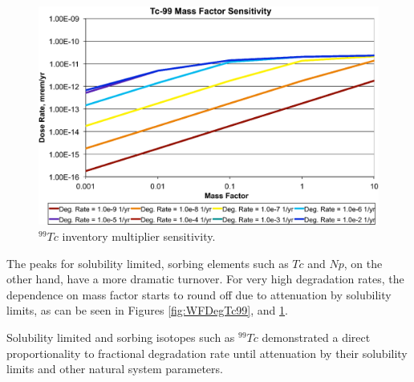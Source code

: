 \begin{figure}[H]
  \centering
  \includegraphics[width=\linewidth]{Tc99_mass_factor.eps}
  \caption{$^{99}Tc$ inventory multiplier sensitivity.}
  \label{fig:WFDegTc99MF}
\end{figure}

The peaks for solubility limited, sorbing elements such as $Tc$ and $Np$, on the 
other hand, have a more dramatic turnover.  For very high degradation rates, the 
dependence on mass factor starts to round off due to attenuation by solubility 
limits, as can be seen in Figures 
\ref{fig:WFDegTc99}, and \ref{fig:WFDegTc99MF}.


Solubility limited and sorbing isotopes such as $^{99}Tc$ demonstrated a direct 
proportionality to fractional degradation rate until attenuation by their 
solubility limits and other natural system parameters. 

